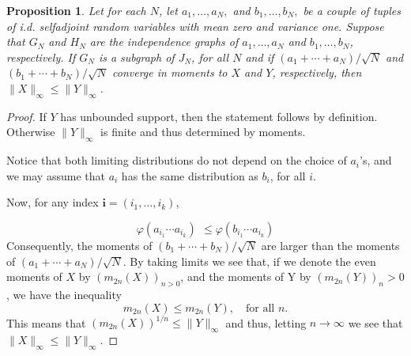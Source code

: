 \documentclass[a4paper,12pt]{extarticle}
\newtheorem{prop}[thm]{Proposition}
\theoremstyle{definition}
\theoremstyle{remark}
\begin{document}
\begin{prop}

	Let for each $N$, let $a_1,\ldots,a_N,$ and $b_1,\ldots,b_N,$ be a couple of tuples of i.d. selfadjoint random variables  with mean zero and variance one. 
	Suppose that $G_N$ and $H_N$ are the independence graphs of $a_1,\ldots,a_N$ and $b_1,\ldots,b_N$, respectively. 
	If $G_N$ is a subgraph of $J_N$, for all $N$ and if $(a_1 + \cdots + a_N)/\sqrt{N}$ and $(b_1 + \cdots + b_N)/\sqrt{N}$ converge in moments to $X$ and $Y$, respectively, then $\|X\|_\infty \leq \|Y\|_\infty$.
\end{prop}

\begin{proof}

  If $Y$ has unbounded support, then the statement follows by definition. Otherwise $\|Y\|_\infty$ is finite and thus determined by moments.

  Notice that both  limiting distributions do not depend on the choice of $a_i$'s, and we may assume that $a_i$ has the same distribution as $b_i$, for all $i$.
  
 Now, for any index $\mathbf{i}=(i_1,\dots,i_k)$,
 
	\[ \varphi(a_{i_1}\cdots a_{i_k})
	\ \, \leq 
	\varphi(b_{i_1}\cdots a_{i_k}) \]
	Consequently, the moments of 
$(b_1 + \cdots + b_N)/\sqrt{N}$ are larger than the moments of $(a_1 + \cdots + a_N)/\sqrt{N}$. 
By taking limits we see that, if we denote the even moments of $X$ by $(m_{2n}(X))_{n>0}$,  and the moments of Y by $(m_{2n}(Y))_n>0$, we have the inequality
 $$m_{2n}(X)\leq m_{2n}(Y),\quad \text{for all } n.$$
 This means that $(m_{2n}(X))^{1/n}\leq \|Y\|_\infty $ and thus, letting $n\to \infty$ we see that  $\|X\|_\infty \leq  \|Y\|_\infty$.
\end{proof}
\end{document}
